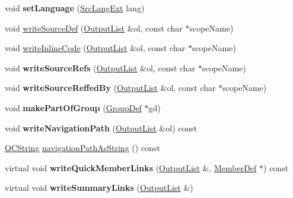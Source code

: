 \begin{DoxyCompactItemize}
void {\bfseries set\+Language} (\mbox{\hyperlink{types_8h_a9974623ce72fc23df5d64426b9178bf2}{Src\+Lang\+Ext}} lang)
\item 
void \mbox{\hyperlink{class_definition_a0d22dcffc0afca75f8ab31dd6261933f}{write\+Source\+Def}} (\mbox{\hyperlink{class_output_list}{Output\+List}} \&ol, const char $\ast$scope\+Name)
\item 
void \mbox{\hyperlink{class_definition_ad5ad17068a22165040e5b256c564c603}{write\+Inline\+Code}} (\mbox{\hyperlink{class_output_list}{Output\+List}} \&ol, const char $\ast$scope\+Name)
\item 
\mbox{\label{class_definition_a0ec765eb2dc050ff415a76c5696db3dc}} 
void {\bfseries write\+Source\+Refs} (\mbox{\hyperlink{class_output_list}{Output\+List}} \&ol, const char $\ast$scope\+Name)
\item 
\mbox{\label{class_definition_aa870f9f2ad5bfb0943d8718ace07bf63}} 
void {\bfseries write\+Source\+Reffed\+By} (\mbox{\hyperlink{class_output_list}{Output\+List}} \&ol, const char $\ast$scope\+Name)
\item 
\mbox{\label{class_definition_aad0c6a6beb616a7f5530c0286b9d4bcc}} 
void {\bfseries make\+Part\+Of\+Group} (\mbox{\hyperlink{class_group_def}{Group\+Def}} $\ast$gd)
\item 
\mbox{\label{class_definition_aeeb612c82bd26d504ef0f0a8758b0837}} 
void {\bfseries write\+Navigation\+Path} (\mbox{\hyperlink{class_output_list}{Output\+List}} \&ol) const
\item 
\mbox{\hyperlink{class_q_c_string}{Q\+C\+String}} \mbox{\hyperlink{class_definition_abb9c001db23e5560b001814fa44934b9}{navigation\+Path\+As\+String}} () const
\item 
\mbox{\label{class_definition_a0eb395213620dc7ab67532ea591752c1}} 
virtual void {\bfseries write\+Quick\+Member\+Links} (\mbox{\hyperlink{class_output_list}{Output\+List}} \&, \mbox{\hyperlink{class_member_def}{Member\+Def}} $\ast$) const
\item 
\mbox{\label{class_definition_a2ea9c73788e47eeb9eed0c77725cb932}} 
virtual void {\bfseries write\+Summary\+Links} (\mbox{\hyperlink{class_output_list}{Output\+List}} \&)
\item 

\end{DoxyCompactItemize}

